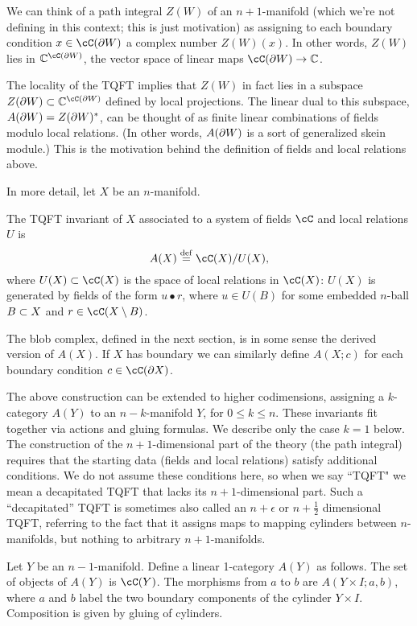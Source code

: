 We can think of a path integral $Z(W)$ of an $n+1$-manifold 
(which we're not defining in this context; this is just motivation) as assigning to each
boundary condition $x\in \cC(\bd W)$ a complex number $Z(W)(x)$.
In other words, $Z(W)$ lies in $\c^{\lf(\bd W)}$, the vector space of linear
maps $\lf(\bd W)\to \c$.

The locality of the TQFT implies that $Z(W)$ in fact lies in a subspace
$Z(\bd W) \sub \c^{\lf(\bd W)}$ defined by local projections.
The linear dual to this subspace, $A(\partial W) = Z(\partial W)^*$,
can be thought of as finite linear combinations of fields modulo local relations.
(In other words, $A(\partial W)$ is a sort of generalized skein module.)
This is the motivation behind the definition of fields and local relations above.

In more detail, let $X$ be an $n$-manifold.
\begin{defn}
\label{defn:TQFT-invariant}
The TQFT invariant of $X$ associated to a system of fields $\cC$ and local relations $U$ is 
	$$A(X) \deq \lf(X) / U(X),$$
where $U(X) \sub \lf(X)$ is the space of local relations in $\lf(X)$:
$U(X)$ is generated by fields of the form $u\bullet r$, where
$u\in U(B)$ for some embedded $n$-ball $B\subset X$ and $r\in \cC(X\setmin B)$.
\end{defn}
The blob complex, defined in the next section, 
is in some sense the derived version of $A(X)$.
If $X$ has boundary we can similarly define $A(X; c)$ for each 
boundary condition $c\in\cC(\bd X)$.

The above construction can be extended to higher codimensions, assigning
a $k$-category $A(Y)$ to an $n{-}k$-manifold $Y$, for $0 \le k \le n$.
These invariants fit together via actions and gluing formulas.
We describe only the case $k=1$ below.
The construction of the $n{+}1$-dimensional part of the theory (the path integral) 
requires that the starting data (fields and local relations) satisfy additional
conditions.
We do not assume these conditions here, so when we say ``TQFT" we mean a decapitated TQFT
that lacks its $n{+}1$-dimensional part. 
Such a ``decapitated'' TQFT is sometimes also called an $n+\epsilon$ or 
$n+\frac{1}{2}$ dimensional TQFT, referring to the fact that it assigns maps to 
mapping cylinders between $n$-manifolds, but nothing to arbitrary $n{+}1$-manifolds.

Let $Y$ be an $n{-}1$-manifold.
Define a linear 1-category $A(Y)$ as follows.
The set of objects of $A(Y)$ is $\cC(Y)$.
The morphisms from $a$ to $b$ are $A(Y\times I; a, b)$, 
where $a$ and $b$ label the two boundary components of the cylinder $Y\times I$.
Composition is given by gluing of cylinders.

